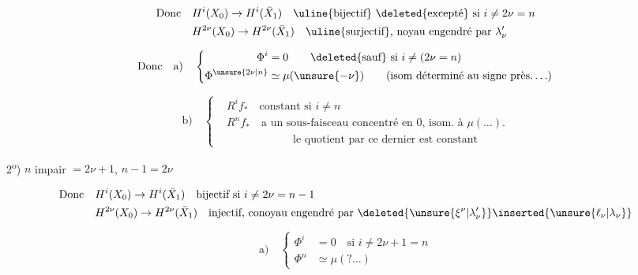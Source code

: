 \[
\begin{aligned}
\text{Donc}\quad & H^i(X_0)\to H^i(\bar X_1)\quad\text{\uline{bijectif} \deleted{excepté} si }i\ne2\nu=n\\
& H^{2\nu}(X_0)\to H^{2\nu}(\bar X_1)\quad\text{\uline{surjectif}, noyau engendré par }\lambda'_\nu
\end{aligned}
\]

\[
\text{Donc}\quad\text{a)}\quad
\left\{\begin{aligned}
\Phi^{i}&=0\qquad \text{\deleted{sauf} si }i\ne(2\nu=n)\\
\Phi^{\unsure{2\nu|n}}&\simeq\mu(\unsure{-\nu})\qquad\text{(isom déterminé au signe près\ldots.)}
\end{aligned}\right.
\]

\[
\text{b)}\quad\left\{\begin{aligned}
&R^i f_*\quad\text{constant si }i\ne n\\
&R^n f_*\quad\text{a un sous-faisceau concentré en $0$, isom. à $\mu(\ldots)$.}\\
&\hspace{6em}\text{le quotient par ce dernier est constant}
\end{aligned}\right.
\]


2\textsuperscript{o}) $n$ impair $=2\nu+1$, \qquad $n-1=2\nu$

\diagram{$\left.\begin{array}{ll}
H^*(X_0):&1,\xi_0,\ \ ,\xi_0^{\nu-1},\xi_0^\nu,\frac12\xi_0^{\nu+1},\ldots\frac12\xi_0^{2\nu}\\[4pt]
H^*(\bar X_1):&1,\xi_1,\ldots\xi_1^{\nu-1},[\xi_1^\nu,\lambda_\nu],\frac12\unsure{\xi_1|\{_1}^{\nu+1},\ldots,\frac12\xi_1^{2\nu}
\end{array}\right]\quad\xi_0\leadsto\xi_1$}

\[
\begin{aligned}
\text{Donc}\quad & H^i(X_0)\to H^i(\bar X_1)\quad\text{bijectif si }i\ne2\nu=n-1\\
& H^{2\nu}(X_0)\to H^{2\nu}(\bar X_1)\quad\text{injectif, conoyau engendré par }\deleted{\unsure{\xi^\nu|\lambda'_\nu}}\inserted{\unsure{\ell_\nu|\lambda_\nu}}
\end{aligned}
\]

\[
\text{a)}\quad\left\{\begin{aligned}\Phi^i&=0\quad\text{si }i\ne2\nu+1=n\\
\Phi^n&\simeq\mu(?\ldots)\end{aligned}\right.
\]

